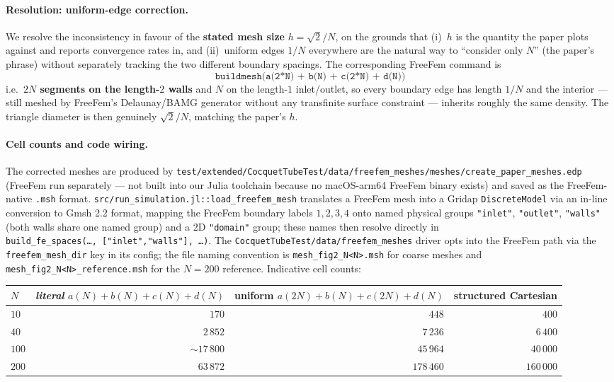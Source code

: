 \documentclass[11pt]{article}
\begin{document}
\paragraph{Resolution: uniform-edge correction.} We resolve the inconsistency in favour of the
\textbf{stated mesh size} $h=\sqrt2/N$, on the grounds that (i)~$h$ is the quantity the paper plots
against and reports convergence rates in, and (ii)~uniform edges $1/N$ everywhere are the natural way to
``consider only $N$'' (the paper's phrase) without separately tracking the two different boundary
spacings. The corresponding FreeFem command is
\[
  \boxed{\ \texttt{buildmesh(a(2*N) + b(N) + c(2*N) + d(N))}\ }
\]
i.e.\ \textbf{$2N$ segments on the length-$2$ walls} and $N$ on the length-$1$ inlet/outlet, so every
boundary edge has length $1/N$ and the interior --- still meshed by FreeFem's Delaunay/BAMG generator
without any transfinite surface constraint --- inherits roughly the same density. The triangle diameter
is then genuinely $\sqrt2/N$, matching the paper's $h$.

\paragraph{Cell counts and code wiring.} The corrected meshes are produced by
\texttt{test/extended/CocquetTubeTest/data/freefem\_meshes/meshes/create\_paper\_meshes.edp}
(FreeFem run separately --- not built into
our Julia toolchain because no macOS-arm64 FreeFem binary exists) and saved as the FreeFem-native
\texttt{.msh} format. \texttt{src/run\_simulation.jl::load\_freefem\_mesh} translates a FreeFem mesh into
a Gridap \texttt{DiscreteModel} via an in-line conversion to Gmsh 2.2 format, mapping the FreeFem
boundary labels $1,2,3,4$ onto named physical groups \texttt{"inlet"}, \texttt{"outlet"}, \texttt{"walls"}
(both walls share one named group) and a 2D \texttt{"domain"} group; these names then resolve directly in
\texttt{build\_fe\_spaces(\ldots,\ ["inlet","walls"],\ \ldots)}. The
\texttt{CocquetTubeTest/data/freefem\_meshes} driver opts into the FreeFem path via the
\texttt{freefem\_mesh\_dir} key in its config; the file naming convention is
\texttt{mesh\_fig2\_N<N>.msh} for coarse meshes and \texttt{mesh\_fig2\_N<N>\_reference.msh} for the
$N=200$ reference. Indicative cell counts:
\begin{center}
\small
\begin{tabular}{@{}lrrr@{}}
\hline
$N$ & \emph{literal} $a(N){+}b(N){+}c(N){+}d(N)$ & \textbf{uniform} $a(2N){+}b(N){+}c(2N){+}d(N)$ & structured Cartesian \\
\hline
$10$  & $170$    & $448$    & $400$   \\
$40$  & $2\,852$ & $7\,236$ & $6\,400$ \\
$100$ & $\sim17\,800$ & $45\,964$ & $40\,000$ \\
$200$ & $63\,872$ & $178\,460$ & $160\,000$ \\
\hline
\end{tabular}
\end{center}
\end{document}
